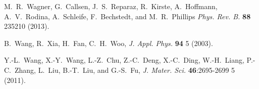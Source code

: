 \documentclass[16pt]{article} %
\begin{document}
\begin{thebibliography}{1}
M.~R.~Wagner, G.~Callsen, J.~S.~Reparaz, R.~Kirste, A.~Hoffmann, A.~V.~Rodina, A.~Schleife, F.~Bechstedt, and M.~R.~Phillips
\newblock \emph{Phys. Rev. B.} \textbf{88} 235210 (2013).

B.~Wang, R.~Xia, H.~Fan, C.~H.~Woo,
\newblock \emph{J. Appl. Phys.} \textbf{94} 5 (2003).

Y.-L.~Wang, X.-Y.~Wang, L.-Z.~Chu, Z.-C.~Deng, X.-C.~Ding, W.-H.~Liang, P.-C.~Zhang, L.~Liu, B.-T.~Liu, and G.-S.~Fu,
\newblock \emph{J. Mater. Sci.} \textbf{46}:2695-2699 5 (2011).



\end{thebibliography}
\end{document}
